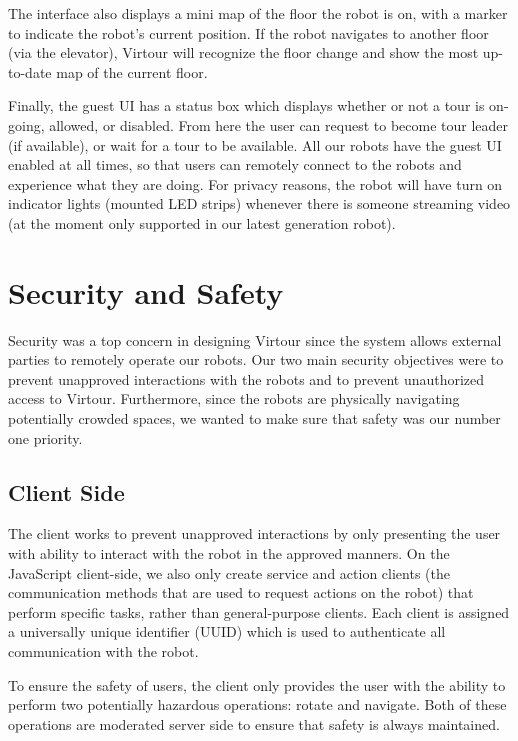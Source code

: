 \documentclass[
  oneside,
  11pt, a4paper,
  footinclude=true,
  headinclude=true,
  cleardoublepage=empty
]{article}
\begin{document}
The interface also displays a mini map of the floor the robot is
on, with a marker to indicate the robot's current position.  If the
robot navigates to another floor (via the elevator), Virtour will recognize the
floor change and show the most up-to-date map of the current floor.

Finally, the guest UI has a status box which displays whether or not a tour is
on-going, allowed, or disabled. From here the user can request to become tour
leader (if available), or wait for a tour to be available. All our robots have
the guest UI enabled at all times, so that users can remotely connect to the
robots and experience what they are doing. For privacy reasons, the robot will
have turn on indicator lights (mounted LED strips) whenever there is someone
streaming video (at the moment only supported in our latest generation robot).

\section{Security and Safety}\label{sec:security}

Security was a top concern in designing Virtour since the system allows
external parties to remotely operate our robots. Our two main security
objectives were to prevent unapproved interactions with the robots and to
prevent unauthorized access to Virtour. Furthermore, since the robots are
physically navigating potentially crowded spaces, we wanted to make sure that
safety was our number one priority.

\subsection{Client Side}

The client works to prevent unapproved interactions by only presenting the user
with ability to interact with the robot in the approved manners. On the
JavaScript client-side, we also only create service and action clients (the
communication methods that are used to request actions on the robot) that
perform specific tasks, rather than general-purpose clients. Each client is
assigned a universally unique identifier (UUID) which is used to authenticate
all communication with the robot.

To ensure the safety of users, the client only provides the user with the
ability to perform two potentially hazardous operations: rotate and navigate.
Both of these operations are moderated server side to ensure that safety is
always maintained.
\end{document}
